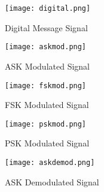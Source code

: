 \begin{figure}[H]
    \centering
    \texttt{[image: digital.png]}
    \caption{Digital Message Signal}
    \label{fig:img1}
\end{figure}

\begin{figure}[H]
    \centering
    \texttt{[image: askmod.png]}
    \caption{ASK Modulated Signal}
    \label{fig:img2}
\end{figure}

\begin{figure}[H]
    \centering
    \texttt{[image: fskmod.png]}
    \caption{FSK Modulated Signal}
    \label{fig:img3}
\end{figure}

\begin{figure}[H]
    \centering
    \texttt{[image: pskmod.png]}
    \caption{PSK Modulated Signal}
    \label{fig:img4}
\end{figure}

\begin{figure}[H]
    \centering
    \texttt{[image: askdemod.png]}
    \caption{ASK Demodulated Signal}
    \label{fig:img5}
\end{figure}
